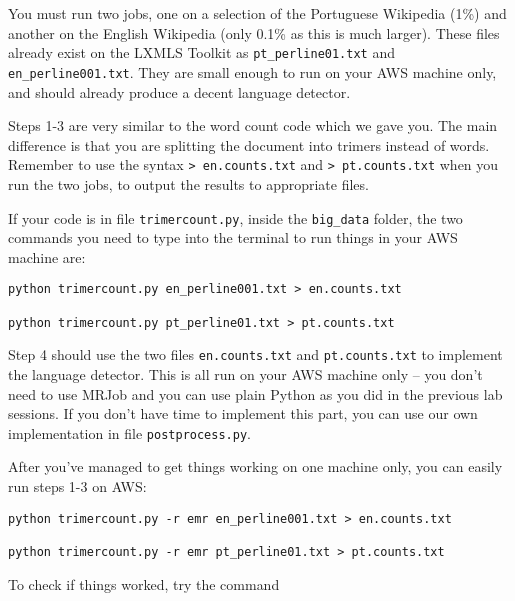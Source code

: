 You must run two jobs, one on a selection of the Portuguese Wikipedia (1\%) and
another on the English Wikipedia (only 0.1\% as this is much larger). These files already exist on the LXMLS Toolkit as \texttt{pt\_perline01.txt} and \texttt{en\_perline001.txt}. They are small enough to run on your AWS machine only, and should already produce a decent language detector.

Steps 1-3 are very similar to the word count code which we gave you. The main difference is that you are splitting the document into trimers instead of words. Remember to use the syntax \texttt{> en.counts.txt} and \texttt{> pt.counts.txt} when you run the two jobs, to output the results to appropriate files.

If your code is in file \texttt{trimercount.py}, inside the \texttt{big\_data} folder, the two commands you need to type into the terminal to run things in your AWS machine are:

%
%

\begin{verbatim}
python trimercount.py en_perline001.txt > en.counts.txt

python trimercount.py pt_perline01.txt > pt.counts.txt
\end{verbatim}

Step 4 should use the two files \texttt{en.counts.txt} and \texttt{pt.counts.txt} to implement the language detector. This is all run on your AWS machine only -- you don't need to use MRJob and you can use plain Python as you did in the previous lab sessions. If you don't have time to implement this part, you can use our own implementation in file \texttt{postprocess.py}.

After you've managed to get things working on one machine only, you can easily run steps 1-3 on AWS:

%

\begin{verbatim}
python trimercount.py -r emr en_perline001.txt > en.counts.txt

python trimercount.py -r emr pt_perline01.txt > pt.counts.txt
\end{verbatim}

To check if things worked, try the command

